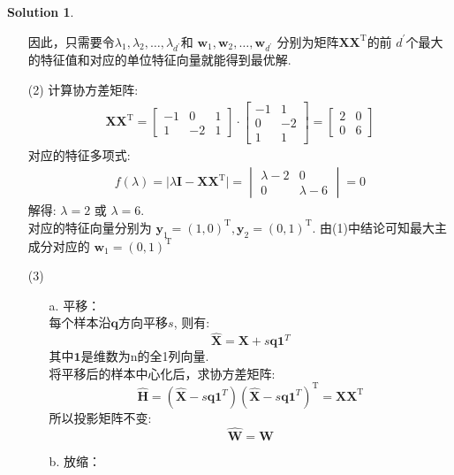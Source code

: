 \documentclass[a4paper,UTF8]{article}
\numberwithin{equation}{section}
\numberwithin{equation}{section}
\theoremstyle{definition}
\newtheorem*{solution}{Solution}
\begin{document}
\begin{solution}
\begin{enumerate}
        因此，只需要令$\lambda_1, \lambda_2, \ldots, \lambda_{d^{\prime}}$和 $\boldsymbol{w}_1, \boldsymbol{w}_2, \ldots, \boldsymbol{w}_{d^{\prime}}$ 分别为矩阵$\mathbf{X X}^{\mathrm{T}}$的前 $d^{\prime}$个最大的特征值和对应的单位特征向量就能得到最优解.
        \item [(2)]
        计算协方差矩阵: 
        \begin{align*}
            \mathbf{X}\mathbf{X}^\mathrm{T} = \begin{bmatrix} -1 & 0 &1  \\ 1 & -2 & 1\end{bmatrix} \cdot \begin{bmatrix} -1 & 1 \\0 & -2 \\1&1\end{bmatrix} = \begin{bmatrix}    2 & 0 \\ 0 & 6        \end{bmatrix}
        \end{align*}
        对应的特征多项式:
        \begin{align*}
            f(\lambda) = \vert \lambda \mathbf{I}-\mathbf{X}\mathbf{X}^\mathrm{T}\vert = \begin{vmatrix} \lambda-2 & 0 \\ 0 & \lambda-6\end{vmatrix} = 0
        \end{align*} 
        解得: $\lambda = 2$ 或 $\lambda = 6$. \\
        对应的特征向量分别为 $\boldsymbol{y}_1 = (1, 0)^\mathrm{T}, \boldsymbol{y}_2=(0,1)^\mathrm{T}$. 由(1)中结论可知最大主成分对应的 $\boldsymbol{w}_1 = (0, 1)^\mathrm{T}$
        \item [(3)]
        \begin{enumerate}
            \item [a. ] 平移： \\
            每个样本沿$\boldsymbol{q}$方向平移$s$, 则有:
            $$\hat{\mathbf{X}}=\mathbf{X}+s \mathbf{q} \mathbf{1}^{T}$$
            其中$\boldsymbol{1}$是维数为n的全1列向量. \\
            将平移后的样本中心化后，求协方差矩阵: 
            $$\hat{\mathbf{H}}=(\hat{\mathbf{X}}-s \mathbf{q} \mathbf{1}^{T})(\hat{\mathbf{X}}-s \mathbf{q} \mathbf{1}^{T})^\mathrm{T}=\mathbf{X}\mathbf{X}^\mathrm{T}$$
            所以投影矩阵不变: $$\hat{\mathbf{W}} = \mathbf{W}$$
            \item [b. ] 放缩： \\

\end{enumerate}
\end{enumerate}
\end{solution}
\end{document}

